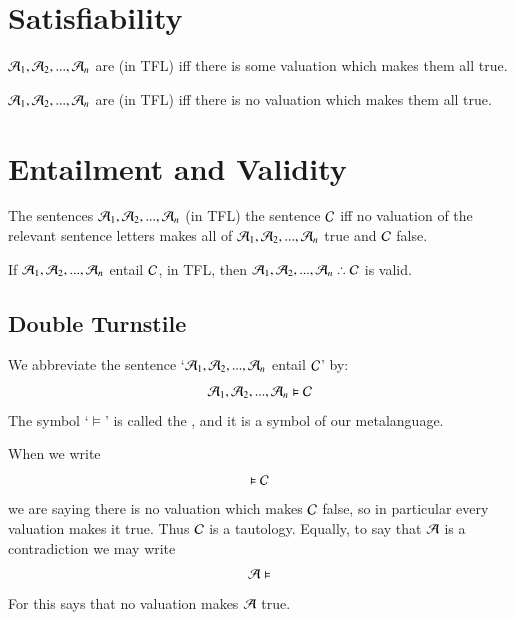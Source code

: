 \documentclass[12pt, a4paper, oneside, openright, titlepage]{book}
\begin{document}
\section{\textsection Satisfiability}

\begin{defn}
    $\mathcal{A}_1,\mathcal{A}_2,...,\mathcal{A}_n$ are  (in TFL) iff there is some valuation which makes them all true.
\end{defn}


\begin{defn}
    $\mathcal{A}_1,\mathcal{A}_2,...,\mathcal{A}_n$ are  (in TFL) iff there is no valuation which makes them all true. 
\end{defn}

\section{\textsection Entailment and Validity}


\begin{defn}
    The sentences $\mathcal{A}_1,\mathcal{A}_2,...,\mathcal{A}_n$  (in TFL) the sentence $\mathcal{C}$ iff no valuation of the relevant sentence letters makes all of $\mathcal{A}_1,\mathcal{A}_2,...,\mathcal{A}_n$ true and $\mathcal{C}$ false.
\end{defn}

\begin{thm}
    If $\mathcal{A}_1,\mathcal{A}_2,...,\mathcal{A}_n$ entail $\mathcal{C}$, in TFL, then $\metav{A}_1,\metav{A}_2,...,\metav{A}_n\therefore \metav{C}$ is valid.
\end{thm}

\subsection{\textsection Double Turnstile}

\begin{defn}
    We abbreviate the sentence `$\mathcal{A}_1,\mathcal{A}_2,...,\mathcal{A}_n$ entail $\mathcal{C}$' by:\begin{equation}
        \mathcal{A}_1,\mathcal{A}_2,...,\mathcal{A}_n\vDash\mathcal{C}
    \end{equation}
    The symbol `$\vDash$' is called the , and it is a symbol of our metalanguage.
\end{defn}

\begin{defn}
    When we write \begin{equation}
        \vDash\mathcal{C}
    \end{equation}
    we are saying there is no valuation which makes $\mathcal{C}$ false, so in particular every valuation makes it true. Thus $\mathcal{C}$ is a tautology. Equally, to say that $\mathcal{A}$ is a contradiction we may write \begin{equation}
        \mathcal{A}\vDash
    \end{equation}
    For this says that no valuation makes $\mathcal{A}$ true.
\end{defn}
\end{document}
